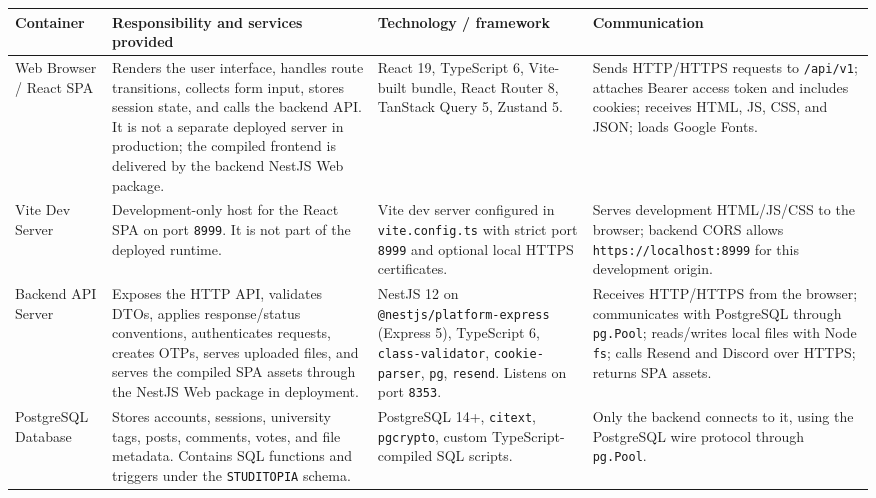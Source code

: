\documentclass[12pt]{article}
\renewcommand{\baselinestretch}{1.5}
\begin{document}
\begingroup
\small
\renewcommand{\baselinestretch}{1.0}\selectfont
\renewcommand{\arraystretch}{1.15}
\setlength{\tabcolsep}{6pt}
\begin{longtable}{|>{\raggedright\arraybackslash}p{}|>{\raggedright\arraybackslash}p{}|>{\raggedright\arraybackslash}p{}|>{\raggedright\arraybackslash}p{}|}
\hline
\textbf{Container} & \textbf{Responsibility and services provided} & \textbf{Technology / framework} & \textbf{Communication} \\ \hline
\endhead
Web Browser / React SPA & Renders the user interface, handles route transitions, collects form input, stores session state, and calls the backend API. It is not a separate deployed server in production; the compiled frontend is delivered by the backend NestJS Web package. & React 19, TypeScript 6, Vite-built bundle, React Router 8, TanStack Query 5, Zustand 5. & Sends HTTP/HTTPS requests to \texttt{/api/v1}; attaches Bearer access token and includes cookies; receives HTML, JS, CSS, and JSON; loads Google Fonts. \\ \hline
Vite Dev Server & Development-only host for the React SPA on port \texttt{8999}. It is not part of the deployed runtime. & Vite dev server configured in \texttt{vite.config.ts} with strict port \texttt{8999} and optional local HTTPS certificates. & Serves development HTML/JS/CSS to the browser; backend CORS allows \texttt{https://localhost:8999} for this development origin. \\ \hline
Backend API Server & Exposes the HTTP API, validates DTOs, applies response/status conventions, authenticates requests, creates OTPs, serves uploaded files, and serves the compiled SPA assets through the NestJS Web package in deployment. & NestJS 12 on \texttt{@nestjs/platform-express} (Express 5), TypeScript 6, \texttt{class-validator}, \texttt{cookie-parser}, \texttt{pg}, \texttt{resend}. Listens on port \texttt{8353}. & Receives HTTP/HTTPS from the browser; communicates with PostgreSQL through \texttt{pg.Pool}; reads/writes local files with Node \texttt{fs}; calls Resend and Discord over HTTPS; returns SPA assets. \\ \hline
PostgreSQL Database & Stores accounts, sessions, university tags, posts, comments, votes, and file metadata. Contains SQL functions and triggers under the \texttt{STUDITOPIA} schema. & PostgreSQL 14+, \texttt{citext}, \texttt{pgcrypto}, custom TypeScript-compiled SQL scripts. & Only the backend connects to it, using the PostgreSQL wire protocol through \texttt{pg.Pool}. \\ \hline

\end{longtable}
\end{document}
